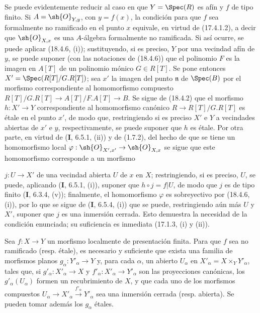 Se puede evidentemente reducir al caso en que $Y=\Spec(R)$ es afín y $f$ de tipo finito. Si $A=\sh{O}_{Y,y}$, con $y=f(x)$, la condición para que $f$ sea formalmente no ramificado en el punto $x$ equivale, en virtud de (17.4.1.2), a decir que $\sh{O}_{X,x}$ es una $A$-álgebra formalmente no ramificada. Si así ocurre, se puede aplicar (18.4.6, (i)); sustituyendo, si es preciso, $Y$ por una vecindad afín de $y$, se puede suponer (con las notaciones de (18.4.6)) que el polinomio $F$ es la imagen en $A[T]$ de un polinomio mónico $G\in R[T]$. Se pone entonces $X'=\Spec(R[T]/G.R[T])$; sea $x'$ la imagen del punto $\mathfrak n$ de $\Spec(B)$ por el morfismo correspondiente al homomorfismo compuesto $R[T]/G.R[T]\to A[T]/F.A[T]\to B$. Se sigue de (18.4.2) que el morfismo $h:X'\to Y$ correspondiente al homomorfismo canónico $R\to R[T]/G.R[T]$ es étale en el punto $x'$, de modo que, restringiendo si es preciso $X'$ e $Y$ a vecindades abiertas de $x'$ e $y$, respectivamente, se puede suponer que $h$ es étale. Por otra parte, en virtud de (\textbf I, 6.5.1, (ii)) y de (1.7.2), del hecho de que se tiene un homomorfismo local $\varphi:\sh{O}_{X',x'}\to\sh{O}_{X,x}$ se sigue que este homomorfismo corresponde a un morfismo


$j:U\to X'$ de una vecindad abierta $U$ de $x$ en $X$; restringiendo, si es preciso, $U$, se puede, aplicando (\textbf I, 6.5.1, (i)), suponer que $h\circ j=f|U$, de modo que $j$ es de tipo finito (\textbf I, 6.3.4, (v)); finalmente, el homomorfismo $\varphi$ es sobreyectivo por (18.4.6, (i)), por lo que se sigue de (\textbf I, 6.5.4, (i)) que se puede, restringiendo aún más $U$ y $X'$, suponer que $j$ es una inmersión cerrada. Esto demuestra la necesidad de la condición enunciada; su suficiencia es inmediata (17.1.3, (i) y (ii)).

\begin{corollary}[18.4.8]
\label{IV.18.4.8}
Sea $f:X\to Y$ un morfismo localmente de presentación finita. Para que $f$ sea no ramificado \textup{(resp.} étale\textup{)}, es necesario y suficiente que exista una familia de morfismos planos $g_\alpha:Y'_\alpha\to Y$ y, para cada $\alpha$, un abierto $U_\alpha$ en $X'_\alpha=X\times_Y Y'_\alpha$, tales que, si $g'_\alpha:X'_\alpha\to X$ y $f'_\alpha:X'_\alpha\to Y'_\alpha$ son las proyecciones canónicas, los $g'_\alpha(U_\alpha)$ formen un recubrimiento de $X$, y que cada uno de los morfismos compuestos $U_\alpha\to X'_\alpha\xrightarrow{f'_\alpha}Y'_\alpha$ sea una inmersión cerrada \textup{(resp.} abierta\textup{)}. Se pueden tomar además los $g_\alpha$ étales.
\end{corollary}

